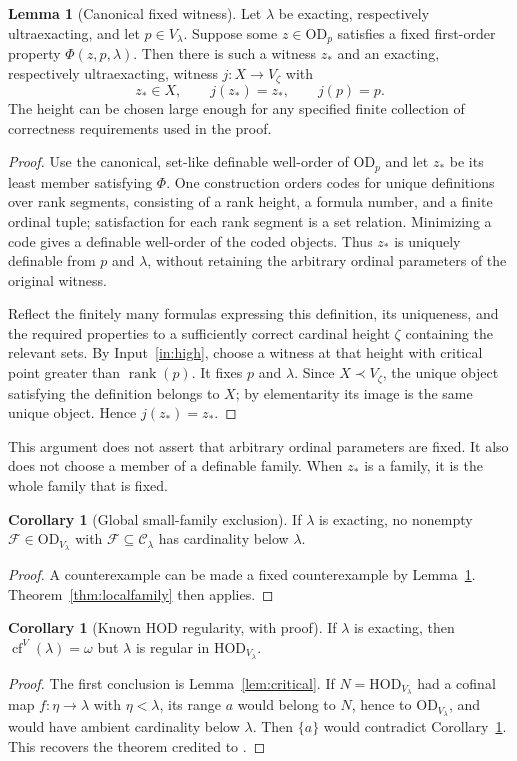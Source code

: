 \documentclass[11pt,letterpaper]{article}
\theoremstyle{definition}
\newtheorem{lemma}[definition]{Lemma}
\newtheorem{corollary}[definition]{Corollary}
\numberwithin{equation}{section}
\newcommand{\HOD}{\mathrm{HOD}}
\newcommand{\OD}{\mathrm{OD}}
\newcommand{\cf}{\operatorname{cf}}
\newcommand{\rank}{\operatorname{rank}}
\newcommand{\C}{\mathcal C_\lambda}
\newcommand{\FF}{\mathcal F}
\newcommand{\NN}{\HOD_{V_\lambda}}
\begin{document}
\begin{lemma}[Canonical fixed witness]\label{lem:canonical}
Let $\lambda$ be exacting, respectively ultraexacting, and let $p\in V_\lambda$. Suppose some $z\in\OD_p$ satisfies a fixed first-order property $\Phi(z,p,\lambda)$. Then there is such a witness $z_*$ and an exacting, respectively ultraexacting, witness $j:X\to V_\zeta$ with
\[
 z_*\in X,\qquad j(z_*)=z_*,\qquad j(p)=p.
\]
The height can be chosen large enough for any specified finite collection of correctness requirements used in the proof.
\end{lemma}
\begin{proof}
Use the canonical, set-like definable well-order of $\OD_p$ and let $z_*$ be its least member satisfying $\Phi$. One construction orders codes for unique definitions over rank segments, consisting of a rank height, a formula number, and a finite ordinal tuple; satisfaction for each rank segment is a set relation. Minimizing a code gives a definable well-order of the coded objects. Thus $z_*$ is uniquely definable from $p$ and $\lambda$, without retaining the arbitrary ordinal parameters of the original witness.

Reflect the finitely many formulas expressing this definition, its uniqueness, and the required properties to a sufficiently correct cardinal height $\zeta$ containing the relevant sets. By Input~\ref{in:high}, choose a witness at that height with critical point greater than $\rank(p)$. It fixes $p$ and $\lambda$. Since $X\prec V_\zeta$, the unique object satisfying the definition belongs to $X$; by elementarity its image is the same unique object. Hence $j(z_*)=z_*$.
\end{proof}

This argument does not assert that arbitrary ordinal parameters are fixed. It also does not choose a member of a definable family. When $z_*$ is a family, it is the whole family that is fixed.

\begin{corollary}[Global small-family exclusion]\label{cor:globalfamily}
If $\lambda$ is exacting, no nonempty $\FF\in\OD_{V_\lambda}$ with $\FF\subseteq\C$ has cardinality below $\lambda$.
\end{corollary}
\begin{proof}
A counterexample can be made a fixed counterexample by Lemma~\ref{lem:canonical}. Theorem~\ref{thm:localfamily} then applies.
\end{proof}

\begin{corollary}[Known HOD regularity, with proof]\label{cor:hodregular}
If $\lambda$ is exacting, then $\cf^V(\lambda)=\omega$ but $\lambda$ is regular in $\NN$.
\end{corollary}
\begin{proof}
The first conclusion is Lemma~\ref{lem:critical}. If $N=\NN$ had a cofinal map $f:\eta\to\lambda$ with $\eta<\lambda$, its range $a$ would belong to $N$, hence to $\OD_{V_\lambda}$, and would have ambient cardinality below $\lambda$. Then $\{a\}$ would contradict Corollary~\ref{cor:globalfamily}. This recovers the theorem credited to \cite[Theorem~2.10]{abl}.
\end{proof}
\end{document}
